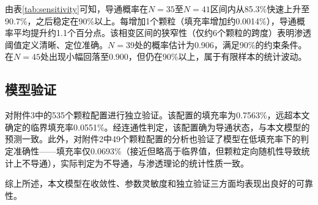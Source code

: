 由表\ref{tab:sensitivity}可知，导通概率在$N=35$至$N=41$区间内从85.3\%快速上升至90.7\%，之后稳定在90\%以上。每增加1个颗粒（填充率增加约0.0014\%），导通概率平均提升约1.1个百分点。该相变区间的狭窄性（仅约6个颗粒的跨度）表明渗透阈值定义清晰、定位准确。$N=39$处的概率估计为0.906，满足90\%的约束条件。在$N=45$处出现小幅回落至0.900，但仍在90\%以上，属于有限样本的统计波动。

\subsection{模型验证}

对附件3中的535个颗粒配置进行独立验证。该配置的填充率为0.7563\%，远超本文确定的临界填充率0.0551\%。经连通性判定，该配置确为导通状态，与本文模型的预测一致。此外，对附件2中49个颗粒配置的分析也验证了模型在低填充率下的判定准确性——填充率仅0.0693\%（接近但略高于临界值，但颗粒定向随机性导致统计上不导通），实际判定为不导通，与渗透理论的统计性质一致。

综上所述，本文模型在收敛性、参数灵敏度和独立验证三方面均表现出良好的可靠性。
